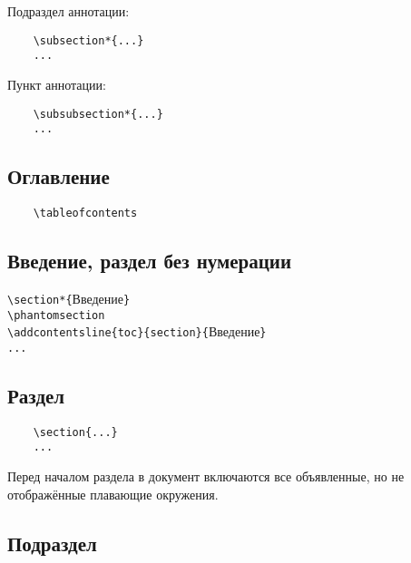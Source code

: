 \documentclass[14pt, a4paper, titlepage]{extarticle}
\renewcommand{\thesection}{\Asbuk{section}}
\let\oldsec\section
\renewcommand{\section}{
		\clearpage
		\phantomsection
		\refstepcounter{section}
		\setcounter{figure}{0} %
		\setcounter{table}{0} %
		\setcounter{equation}{0} %
		\addcontentsline{toc}{section}{\appendixname~\thesection}
		\oldsec*} %
\begin{document}
Подраздел аннотации:
\begin{verbatim}
	\subsection*{...}
	...
\end{verbatim}

Пункт аннотации:
\begin{verbatim}
	\subsubsection*{...}
	...
\end{verbatim}

\subsection{Оглавление}

\begin{verbatim}
	\tableofcontents
\end{verbatim}

\subsection{Введение, раздел без нумерации}

\noindent\verb"\section*{"Введение\verb"}"\\
\verb"\phantomsection"\\
\verb"\addcontentsline{toc}{section}{"Введение\verb"}"\\
\verb"..."

\subsection{Раздел}

\begin{verbatim}
	\section{...}
	...
\end{verbatim}

Перед началом раздела в документ включаются все объявленные, но не отображённые плавающие окружения.

\subsection{Подраздел}
\end{document}
